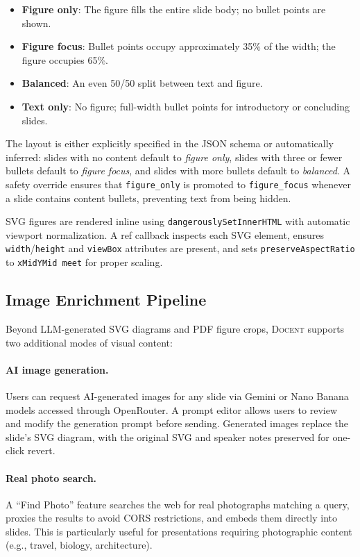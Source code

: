 \documentclass[11pt,a4paper]{article}
\newcommand{\system}{\textsc{Docent}\xspace}
\begin{document}
\begin{itemize}[leftmargin=*,nosep]
    \item \textbf{Figure only}: The figure fills the entire slide body; no bullet points are shown.
    \item \textbf{Figure focus}: Bullet points occupy approximately 35\% of the width; the figure occupies 65\%.
    \item \textbf{Balanced}: An even 50/50 split between text and figure.
    \item \textbf{Text only}: No figure; full-width bullet points for introductory or concluding slides.
\end{itemize}

The layout is either explicitly specified in the JSON schema or automatically inferred: slides with no content default to \emph{figure only}, slides with three or fewer bullets default to \emph{figure focus}, and slides with more bullets default to \emph{balanced}.
A safety override ensures that \texttt{figure\_only} is promoted to \texttt{figure\_focus} whenever a slide contains content bullets, preventing text from being hidden.

SVG figures are rendered inline using \texttt{dangerouslySetInnerHTML} with automatic viewport normalization.
A ref callback inspects each SVG element, ensures \texttt{width}/\texttt{height} and \texttt{viewBox} attributes are present, and sets \texttt{preserveAspectRatio} to \texttt{xMidYMid meet} for proper scaling.

\subsection{Image Enrichment Pipeline}
\label{sec:images}

Beyond LLM-generated SVG diagrams and PDF figure crops, \system supports two additional modes of visual content:

\paragraph{AI image generation.}
Users can request AI-generated images for any slide via Gemini or Nano Banana models accessed through OpenRouter.
A prompt editor allows users to review and modify the generation prompt before sending.
Generated images replace the slide's SVG diagram, with the original SVG and speaker notes preserved for one-click revert.

\paragraph{Real photo search.}
A ``Find Photo'' feature searches the web for real photographs matching a query, proxies the results to avoid CORS restrictions, and embeds them directly into slides.
This is particularly useful for presentations requiring photographic content (e.g., travel, biology, architecture).
\end{document}
